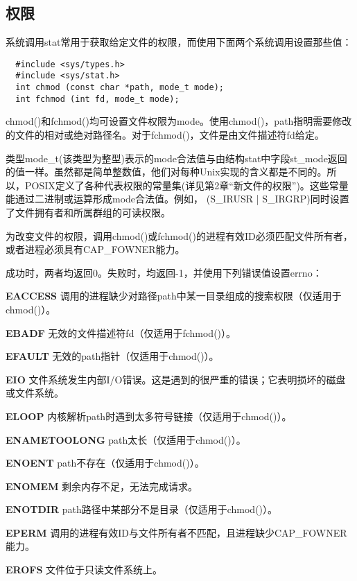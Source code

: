 \subsection{权限}

系统调用stat常用于获取给定文件的权限，而使用下面两个系统调用设置那些值：

\begin{lstlisting}
  #include <sys/types.h>
  #include <sys/stat.h>
  int chmod (const char *path, mode_t mode);
  int fchmod (int fd, mode_t mode);
\end{lstlisting}

chmod()和fchmod()均可设置文件权限为mode。使用chmod()，path指明需要修改的文件的相对或绝对路径名。对于fchmod()，文件是由文件描述符fd给定。

类型mode\_t(该类型为整型)表示的mode合法值与由结构stat中字段st\_mode返回的值一样。虽然都是简单整数值，他们对每种Unix实现的含义都是不同的。所以，POSIX定义了各种代表权限的常量集(详见第2章“新文件的权限”)。这些常量能通过二进制或运算形成mode合法值。例如， (S\_IRUSR | S\_IRGRP)同时设置了文件拥有者和所属群组的可读权限。

为改变文件的权限，调用chmod()或fchmod()的进程有效ID必须匹配文件所有者，或者进程必须具有CAP\_FOWNER能力。

成功时，两者均返回0。失败时，均返回-1，并使用下列错误值设置errno：

\begin{eqlist*}
\item[\textbf{EACCESS}] 调用的进程缺少对路径path中某一目录组成的搜索权限（仅适用于chmod()）。
\item[\textbf{EBADF}] 无效的文件描述符fd（仅适用于fchmod()）。
\item[\textbf{EFAULT}] 无效的path指针（仅适用于chmod()）。
\item[\textbf{EIO}] 文件系统发生内部I/O错误。这是遇到的很严重的错误；它表明损坏的磁盘或文件系统。
\item[\textbf{ELOOP}] 内核解析path时遇到太多符号链接（仅适用于chmod()）。
\item[\textbf{ENAMETOOLONG}] path太长（仅适用于chmod()）。
\item[\textbf{ENOENT}] path不存在（仅适用于chmod()）。
\item[\textbf{ENOMEM}] 剩余内存不足，无法完成请求。
\item[\textbf{ENOTDIR}] path路径中某部分不是目录（仅适用于chmod()）。
\item[\textbf{EPERM}] 调用的进程有效ID与文件所有者不匹配，且进程缺少CAP\_FOWNER能力。
\item[\textbf{EROFS}] 文件位于只读文件系统上。
\end{eqlist*}

